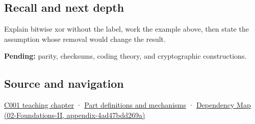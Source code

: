 \subsection{Recall and next depth}\label{appendix-d49161831368-recall-and-next-depth}

Explain bitwise xor without the label, work the example above, then state the assumption whose removal would change the result.

\textbf{Pending:} parity, checksums, coding theory, and cryptographic constructions.

\subsection{Source and navigation}\label{appendix-d49161831368-source-and-navigation}

\hyperref[01-foundations-i-ch001-from-a-signal-to-an-interpretation]{C001 teaching chapter} · \hyperref[appendix-fd090d982a15]{Part definitions and mechanisms} · \href{../02-Foundations-II/main.pdf\#nameddest=appendix-4ad47bdd269a}{Dependency Map (02-Foundations-II, appendix-4ad47bdd269a)}

